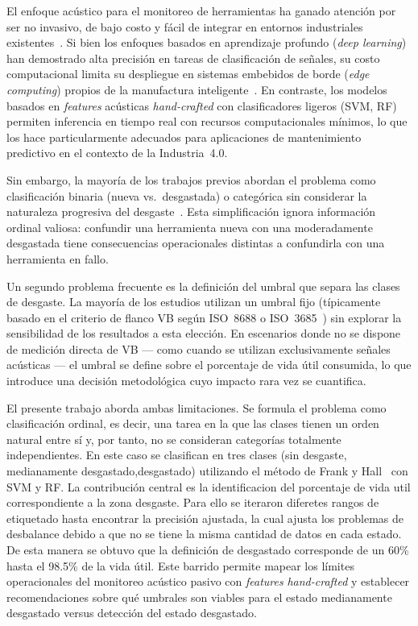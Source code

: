 \documentclass[10pt,twocolumn]{article}
\begin{document}
El enfoque acústico para el monitoreo de herramientas ha ganado atención por
ser no invasivo, de bajo costo y fácil de integrar en entornos industriales
existentes~\cite{charoenprasit2018, orejarena2014, meneses2020}. Si bien
los enfoques basados en aprendizaje profundo (\textit{deep learning}) han
demostrado alta precisión en tareas de clasificación de señales, su costo
computacional limita su despliegue en sistemas embebidos de borde
(\textit{edge computing}) propios de la manufactura
inteligente~\cite{groover2007}. En contraste, los modelos basados en
\textit{features} acústicas \textit{hand-crafted} con clasificadores
ligeros (SVM, RF) permiten inferencia en tiempo real con recursos
computacionales mínimos, lo que los hace particularmente adecuados para
aplicaciones de mantenimiento predictivo en el contexto de la
Industria~4.0.

Sin embargo, la mayoría de los trabajos previos abordan el problema como
clasificación binaria (nueva vs.\ desgastada) o categórica sin considerar
la naturaleza progresiva del desgaste~\cite{banda2024}. Esta simplificación
ignora información ordinal valiosa: confundir una herramienta nueva con una
moderadamente desgastada tiene consecuencias operacionales distintas a
confundirla con una herramienta en fallo.

Un segundo problema frecuente es la definición del umbral que separa las
clases de desgaste. La mayoría de los estudios utilizan un umbral fijo
(típicamente basado en el criterio de flanco VB según ISO~8688 o
ISO~3685~\cite{iso8688}) sin explorar la sensibilidad de los resultados a
esta elección. En escenarios donde no se dispone de medición directa de VB
--- como cuando se utilizan exclusivamente señales acústicas --- el umbral
se define sobre el porcentaje de vida útil consumida, lo que introduce una
decisión metodológica cuyo impacto rara vez se cuantifica.

El presente trabajo aborda ambas limitaciones. Se formula el problema como
clasificación ordinal, es decir, una tarea en la que las clases tienen un orden 
natural entre sí y, por tanto, no se consideran categorías totalmente independientes.
 En este caso se clasifican en tres clases (sin desgaste, medianamente 
 desgastado,desgastado) utilizando el método de Frank y Hall~\cite{frank2001} con SVM y
RF. La contribución central es la identificacion del porcentaje de vida util
correspondiente a la zona desgaste. Para ello se iteraron diferetes rangos de etiquetado
hasta encontrar la precisión ajustada, la cual ajusta los problemas de desbalance debido a
que no se tiene la misma cantidad de datos en cada estado. De esta manera se obtuvo que la
definición de desgastado corresponde de un 60\% hasta el 98.5\% de la vida útil. 
Este barrido permite mapear los
límites operacionales del monitoreo acústico pasivo con \textit{features}
\textit{hand-crafted} y establecer recomendaciones sobre qué umbrales son
viables para el estado medianamente desgastado versus detección del estado desgastado.
\end{document}
